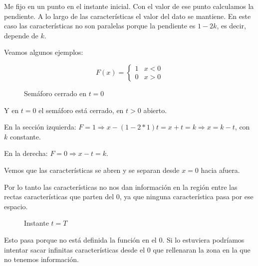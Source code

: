		Me fijo en un punto en el instante inicial. Con el valor de ese punto calculamos la pendiente. A lo largo de las características el valor del dato se mantiene. En este caso las características no son paralelas porque la pendiente es $1-2k$, es decir, depende de $k$.

		\begin{figure}[!htb]
			\centering
			\caption{}
			\label{fig:rectasDivergentes}
		\end{figure}

		\newpage

		Veamos algunos ejemplos:

		\begin{example}[Semáforo]

			$$F(x) =
			\begin{cases}
				1 & x < 0 \\
				0 & x > 0
			\end{cases}
			$$

			\begin{figure}[!htb]
				\centering
				\caption{Semáforo cerrado en $t=0$}
				\label{fig:semaforoCerrado}
			\end{figure}

			Y en $t=0$ el semáforo está cerrado, en $t>0$ abierto.

			En la sección izquierda: $ F = 1 \Rightarrow x - (1 - 2*1)t = x + t = k \Rightarrow x = k -t $, con $k$ constante.

			En la derecha: $F = 0 \Rightarrow x-t = k$.

			\begin{figure}[!htb]
				\centering
				\caption{}
				\label{fig:caracteristicasSemaforo}
			\end{figure}

			Vemos que las características se abren y se separan desde $x=0$ hacia afuera.

			Por lo tanto las características no nos dan información en la región entre las rectas características que parten del $0$, ya que ninguna característica pasa por ese espacio.

			\begin{figure}[!htb]
				\centering
				\caption{Instante $t=T$}
				\label{fig:semaforoT}
			\end{figure}

			Esto pasa porque no está definida la función en el $0$. Si lo estuviera podríamos intentar sacar infinitas características desde el 0 que rellenaran la zona en la que no tenemos información.

		\end{example}

